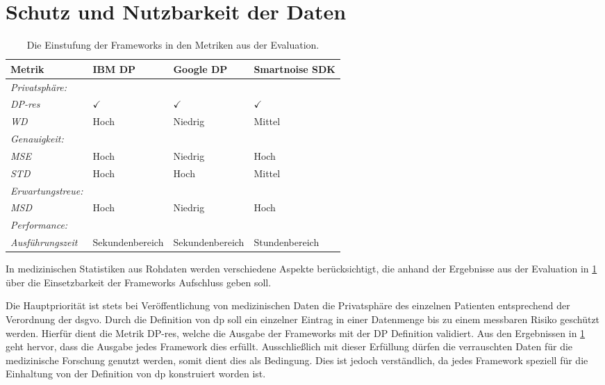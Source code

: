 \section{Schutz und Nutzbarkeit der Daten}
\begin{table}[h]
	\centering
	\begin{tabular}{ l l l l} \toprule
		\textbf{Metrik} & \textbf{IBM DP} & \textbf{Google DP} & \textbf{Smartnoise SDK}  \\ \midrule
		\textit{Privatsphäre:}&&&\\ \hline
		\textit{DP-res}	& $\checkmark$ &$\checkmark$ &$\checkmark$ \\ 
		\textit{WD}	& Hoch  & Niedrig & Mittel \\
		\textit{Genauigkeit:}&&&\\ \hline
		\textit{MSE}	& Hoch & Niedrig & Hoch\\
		\textit{STD}	&  Hoch& Hoch & Mittel\\
		\textit{Erwartungstreue:}&&&\\ \hline
		\textit{MSD}	&  Hoch & Niedrig & Hoch\\ 
		\textit{Performance:}&&&\\ \hline
		\textit{Ausführungszeit}	&  Sekundenbereich & Sekundenbereich & Stundenbereich\\ \bottomrule
	\end{tabular}
	\caption{Die Einstufung der Frameworks in den Metriken aus der Evaluation.}
	\label{tab : classification}
\end{table}

In medizinischen Statistiken aus Rohdaten werden verschiedene Aspekte berücksichtigt, die anhand der Ergebnisse aus der Evaluation in \cref{tab : classification} über die Einsetzbarkeit der Frameworks Aufschluss geben soll.

Die Hauptpriorität ist stets bei Veröffentlichung von medizinischen Daten die Privatsphäre des einzelnen Patienten entsprechend der Verordnung der \gls{dsgvo}. Durch die Definition von \gls{dp} soll ein einzelner Eintrag in einer Datenmenge bis zu einem messbaren Risiko geschützt werden. Hierfür dient die Metrik DP-res, welche die Ausgabe der Frameworks mit der DP Definition validiert. Aus den Ergebnissen in \cref{tab : classification} geht hervor, dass die Ausgabe jedes Framework dies erfüllt. Ausschließlich mit dieser Erfüllung dürfen die verrauschten Daten für die medizinische Forschung genutzt werden, somit dient dies als Bedingung. Dies ist jedoch verständlich, da jedes Framework speziell für die Einhaltung von der Definition von \gls{dp} konstruiert worden ist.

